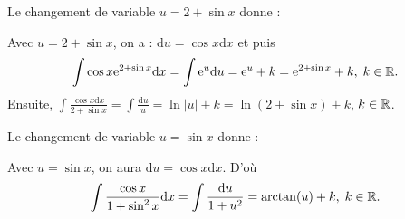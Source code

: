 \begin{question}
Le changement de variable $u=2+\sin x$ donne :
\begin{answers}  
\end{answers}
\begin{explanations}
Avec $u=2+\sin x$, on a : $\mathrm{d}u=\cos x\mathrm{d}x$ et puis
$$\int \cos x\mathrm{e}^{2+\sin x}\mathrm{d}x=\int \mathrm{e}^{u}\mathrm{d}u=\mathrm{e}^{u}+k=\mathrm{e}^{2+\sin x}+k,\; k\in \mathbb{R}.$$
Ensuite, $\displaystyle \int \frac{\cos x\mathrm{d}x}{2+\sin x}=\int \frac{\mathrm{d}u}{u}=\ln |u|+k=\ln (2+\sin x)+k$, $k\in \mathbb{R}$.
\end{explanations}
\end{question}


\begin{question}
Le changement de variable $u=\sin x$ donne :
\begin{answers}  
\end{answers}
\begin{explanations}
Avec $u=\sin x$, on aura $\displaystyle \mathrm{d}u=\cos x\mathrm{d}x$. D'où
$$\int \frac{\cos x}{1+\sin ^2x}\mathrm{d}x=\int \frac{\mathrm{d}u}{1+u^2}=\arctan (u)+k,\; k\in \mathbb{R}.$$
\end{explanations}
\end{question}

